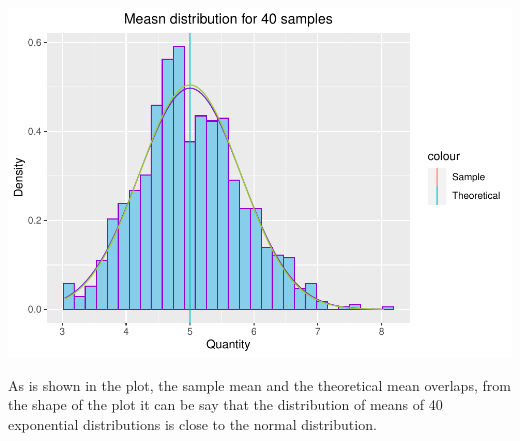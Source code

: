 \documentclass[
]{article}
\begin{document}
\includegraphics{Statistical-Inference-Course-Project_files/figure-latex/plot-1.pdf}

As is shown in the plot, the sample mean and the theoretical mean
overlaps, from the shape of the plot it can be say that the distribution
of means of 40 exponential distributions is close to the normal
distribution.
\end{document}

